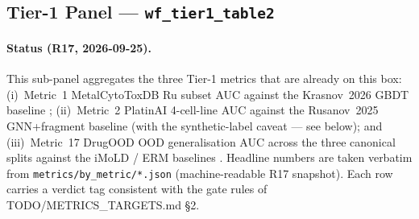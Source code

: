 %
%
%

\subsection{Tier-1 Panel — \texttt{wf\_tier1\_table2}}
\label{sec:results:tier1-panel}

\paragraph{Status (R17, 2026-09-25).}
This sub-panel aggregates the three Tier-1 metrics that are
already \MEASURED{} on this box:
(i)~Metric~1 MetalCytoToxDB Ru subset AUC against the
Krasnov~2026 GBDT baseline \cite{krasnov2026metalcytotoxdb};
(ii)~Metric~2 PlatinAI 4-cell-line AUC against the
Rusanov~2025 GNN+fragment baseline \cite{rusanov2025platinai}
(with the synthetic-label caveat — see below); and
(iii)~Metric~17 DrugOOD OOD generalisation AUC across the three
canonical splits against the iMoLD / ERM baselines
\cite{imold2024,drugood2022}.  Headline numbers are taken
verbatim from \texttt{metrics/by\_metric/*.json} (machine-readable
R17 snapshot).  Each row carries a verdict tag consistent with the
gate rules of TODO/METRICS\_TARGETS.md §2.

